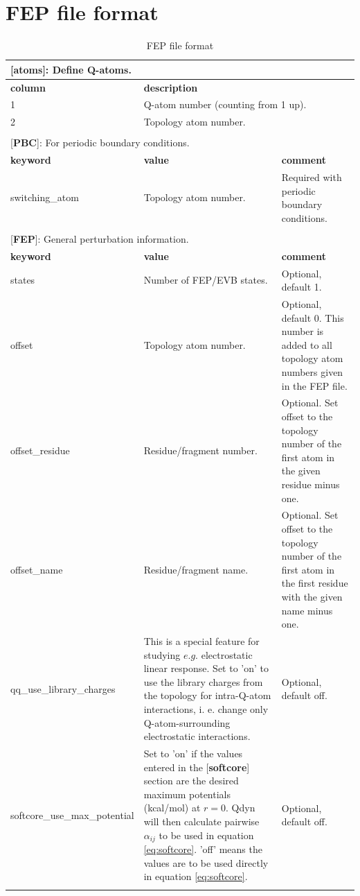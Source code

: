 \documentclass[a4paper,12pt]{article}
\begin{document}
\section{FEP file format}
\small
\begin{longtable}{|p{53pt}|p{181pt}|p{160pt}|}
\caption{FEP file format}
\label{tab:fepfileformat}
\endhead

\multicolumn{3}{p{394pt}}{[\textbf{atoms}]: Define Q-atoms.}\\
\hline \textbf{column} & \multicolumn{2}{p{341pt}|}{\textbf{description}}\\
\hline 1 & \multicolumn{2}{p{341pt}|}{Q-atom number (counting from 1 up).}\\
\hline 2 & \multicolumn{2}{p{341pt}|}{Topology atom number.}\\
\hline
\multicolumn{3}{p{394pt}}{}\\



\multicolumn{3}{p{394pt}}{[\textbf{PBC}]: For periodic boundary conditions.}\\
\hline \textbf{keyword} & \textbf{value} & \textbf{comment}\\
\hline switching\-\_atom & Topology atom number. & Required with periodic boundary conditions.\\
\hline
\multicolumn{3}{p{394pt}}{}\\

\multicolumn{3}{p{394pt}}{[\textbf{FEP}]: General perturbation information.}\\
\hline \textbf{keyword} & \textbf{value} & \textbf{comment}\\
\hline states & Number of FEP/EVB states. & Optional, default 1.\\
\hline offset & Topology atom number. & Optional, default 0. This number is  added to all topology atom numbers given in the FEP file.\\
\hline offset\_residue & Residue/fragment number. & Optional. Set offset to the topology number of the first atom in the given residue minus one.\\
\hline offset\_name & Residue/fragment name. & Optional. Set offset to the topology number of the first atom in the first residue with the given name minus one.\\
\hline qq\_use\-\_library\-\_charges & This is a special feature for studying $e.g.$ electrostatic linear response. Set to 'on' to use the library charges from the topology for intra-Q-atom interactions, i. e. change only Q-atom-surrounding electrostatic interactions. &Optional, default off.\\
\hline softcore\-\_use\-\_max\-\_potential & Set to 'on' if the values entered in the [\textbf{softcore}] section are the desired maximum potentials (kcal/mol) at $r=0$. Qdyn will then calculate pairwise $\alpha_{ij}$ to be used in equation \ref{eq:softcore}. 'off' means the values are to be used directly in equation \ref{eq:softcore}.&Optional, default off.\\
\hline
\multicolumn{3}{p{394pt}}{}\\


\end{longtable}
\end{document}
